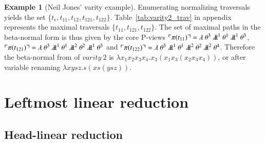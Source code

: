 \documentclass{elsarticle}
\theoremstyle{plain}
\theoremstyle{definition}
\newtheorem{example}{Example}[section]
\theoremstyle{remark}
\newcommand{\ghostlmd}{{\lambda\!\!\lambda}}
\newcommand{\ghostvar}{\theta}
\def\coresymbol{\pi} %
\newcommand{\core}[1]{\coresymbol(#1)} %
\begin{document}
\begin{example}[Neil Jones' varity example]
Enumerating normalizing traversals yields the set $\{t_\epsilon, t_{11}, t_{12}, t_{121}, t_{122} \}$. Table~\ref{tab:varity2_trav} in appendix represents the maximal traversals $\{ t_{11}, t_{121}, t_{122} \}$. The set of maximal paths in the beta-normal form is thus given by the core P-views
$\pview{\core{t_{11}}} =
        \lambda \ \ghostvar^{3}\ \ghostlmd^{1}\
        \ghostvar^{1}\ \ghostlmd^{1}\ \ghostvar^{3}
$,
$\pview{\core{t_{121}}} =
        \lambda \ \ghostvar^{3}\ \ghostlmd^{1}\ \ghostvar^{1}\ \ghostlmd^{2}\ \ghostvar^{2}\ \ghostlmd^{1}\ \ghostvar^{3}$
and
$\pview{\core{t_{122}}} =
    \lambda \ \ghostvar^{3}\ \ghostlmd^{1}\ \ghostvar^{1}\ \ghostlmd^{2}\ \ghostvar^{2}\ \ghostlmd^{2}\ \ghostvar^{4}$.
Therefore the beta-normal from of $varity\ 2$ is
$\lambda x_1 x_2 x_3 x_4 . x_3 (x_1 x_3 (x_2 x_3 x_4))$,
or after variable renaming $\lambda x y s z . s (x s (y s z))$.
\end{example}


\section{Leftmost linear reduction}
\label{sec:leftmostlinearred}


\subsection{Head-linear reduction}
\end{document}
